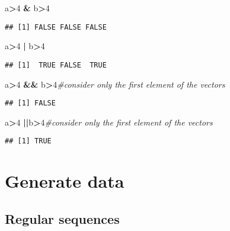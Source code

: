\documentclass[]{book}
\newenvironment{Shaded}{\begin{snugshade}}{\end{snugshade}}
\newcommand{\DecValTok}[1]{\textcolor[rgb]{0.00,0.00,0.81}{#1}}
\newcommand{\StringTok}[1]{\textcolor[rgb]{0.31,0.60,0.02}{#1}}
\newcommand{\CommentTok}[1]{\textcolor[rgb]{0.56,0.35,0.01}{\textit{#1}}}
\newcommand{\OperatorTok}[1]{\textcolor[rgb]{0.81,0.36,0.00}{\textbf{#1}}}
\newcommand{\NormalTok}[1]{#1}
\theoremstyle{definition}
\theoremstyle{definition}
\theoremstyle{definition}
\theoremstyle{remark}
\begin{document}
\begin{Shaded}
\begin{Highlighting}[]
\NormalTok{a}\OperatorTok{>}\DecValTok{4} \OperatorTok{&}\StringTok{ }\NormalTok{b}\OperatorTok{>}\DecValTok{4}
\end{Highlighting}
\end{Shaded}

\begin{verbatim}
## [1] FALSE FALSE FALSE
\end{verbatim}

\begin{Shaded}
\begin{Highlighting}[]
\NormalTok{a}\OperatorTok{>}\DecValTok{4} \OperatorTok{|}\StringTok{ }\NormalTok{b}\OperatorTok{>}\DecValTok{4}
\end{Highlighting}
\end{Shaded}

\begin{verbatim}
## [1]  TRUE FALSE  TRUE
\end{verbatim}

\begin{Shaded}
\begin{Highlighting}[]
\NormalTok{a}\OperatorTok{>}\DecValTok{4} \OperatorTok{&&}\StringTok{ }\NormalTok{b}\OperatorTok{>}\DecValTok{4}\CommentTok{#consider only the first element of the vectors }
\end{Highlighting}
\end{Shaded}

\begin{verbatim}
## [1] FALSE
\end{verbatim}

\begin{Shaded}
\begin{Highlighting}[]
\NormalTok{a}\OperatorTok{>}\DecValTok{4} \OperatorTok{||}\NormalTok{b}\OperatorTok{>}\DecValTok{4}\CommentTok{#consider only the first element of the vectors }
\end{Highlighting}
\end{Shaded}

\begin{verbatim}
## [1] TRUE
\end{verbatim}

\section{Generate data}\label{generate-data}

\subsection{Regular sequences}\label{regular-sequences}
\end{document}
